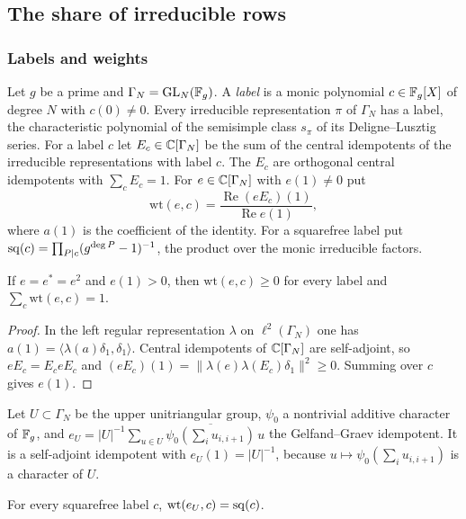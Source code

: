 \subsection{The share of irreducible rows}\label{w2:sec:irr}

\subsubsection{Labels and weights}

Let $g$ be a prime and $\Gamma_N=\mathrm{GL}_N(\mathbb F_g)$. A \emph{label} is a monic polynomial $c\in\mathbb F_g[X]$ of degree $N$ with $c(0)\ne0$. Every irreducible representation $\pi$ of $\Gamma_N$ has a label, the characteristic polynomial of the semisimple class $s_\pi$ of its Deligne--Lusztig series. For a label $c$ let $E_c\in\mathbb C[\Gamma_N]$ be the sum of the central idempotents of the irreducible representations with label $c$. The $E_c$ are orthogonal central idempotents with $\sum_cE_c=1$. For $e\in\mathbb C[\Gamma_N]$ with $e(1)\ne0$ put
\[
\mathrm{wt}(e,c)=\frac{\operatorname{Re}(eE_c)(1)}{\operatorname{Re}e(1)},
\]
where $a(1)$ is the coefficient of the identity. For a squarefree label put $\mathrm{sq}(c)=\prod_{P\mid c}(g^{\deg P}-1)^{-1}$, the product over the monic irreducible factors.

\begin{lemma}\label{w2:wtprob}
If $e=e^*=e^2$ and $e(1)>0$, then $\mathrm{wt}(e,c)\ge0$ for every label and $\sum_c\mathrm{wt}(e,c)=1$.
\end{lemma}

\begin{proof}
In the left regular representation $\lambda$ on $\ell^2(\Gamma_N)$ one has $a(1)=\langle\lambda(a)\delta_1,\delta_1\rangle$. Central idempotents of $\mathbb C[\Gamma_N]$ are self-adjoint, so $eE_c=E_ceE_c$ and $(eE_c)(1)=\lVert\lambda(e)\lambda(E_c)\delta_1\rVert^2\ge0$. Summing over $c$ gives $e(1)$.
\end{proof}

Let $U\subset\Gamma_N$ be the upper unitriangular group, $\psi_0$ a nontrivial additive character of $\mathbb F_g$, and $e_U=|U|^{-1}\sum_{u\in U}\overline{\psi_0(\sum_iu_{i,i+1})}\,u$ the Gelfand--Graev idempotent. It is a self-adjoint idempotent with $e_U(1)=|U|^{-1}$, because $u\mapsto\psi_0(\sum_iu_{i,i+1})$ is a character of $U$.

\begin{proposition}\label{w2:GG}
For every squarefree label $c$, $\mathrm{wt}(e_U,c)=\mathrm{sq}(c)$.
\end{proposition}

